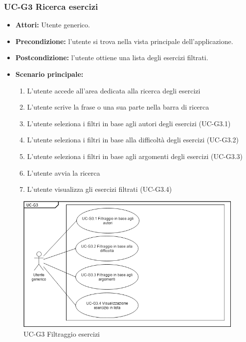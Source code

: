 	\subsubsection{UC-G3 Ricerca esercizi}
		\begin{itemize}
			\item\textbf{ Attori:} Utente generico.
			\item \textbf{Precondizione:} l'utente si trova nella vista principale dell'applicazione.
			\item \textbf{Postcondizione:} l'utente ottiene una lista degli esercizi filtrati.
			\item \textbf{Scenario principale:}
				\begin{enumerate}
					\item L'utente accede all'area dedicata alla ricerca degli esercizi
					\item L'utente scrive la frase o una sua parte nella barra di ricerca
					\item L'utente seleziona i filtri in base agli autori degli esercizi (UC-G3.1)
					\item L'utente seleziona i filtri in base alla difficoltà degli esercizi (UC-G3.2)
					\item L'utente seleziona i filtri in base agli argomenti degli esercizi (UC-G3.3)
					\item L'utente avvia la ricerca
					\item L'utente visualizza gli esercizi filtrati (UC-G3.4)
				\end{enumerate}
		\end{itemize}
		\begin{figure}[h]
			\centering
			\includegraphics[scale=0.7]{images/UC-G3.png}
			\caption{UC-G3 Filtraggio esercizi}
		\end{figure}	

